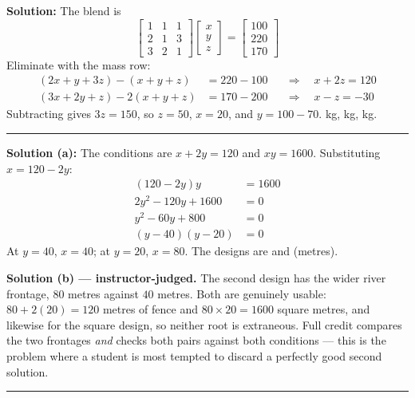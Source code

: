 \documentclass[12pt]{article}
\begin{document}
\textbf{Solution:} The blend is
\[ \begin{bmatrix} 1 & 1 & 1 \\ 2 & 1 & 3 \\ 3 & 2 & 1 \end{bmatrix}
   \begin{bmatrix} x \\ y \\ z \end{bmatrix}
   = \begin{bmatrix} 100 \\ 220 \\ 170 \end{bmatrix} \]
Eliminate with the mass row:
\begin{align*}
  (2x + y + 3z) - (x + y + z) &= 220 - 100 &&\Longrightarrow\quad x + 2z = 120 \\
  (3x + 2y + z) - 2(x + y + z) &= 170 - 200 &&\Longrightarrow\quad x - z = -30
\end{align*}
Subtracting gives $3z = 150$, so $z = 50$, $x = 20$, and $y = 100 - 70$.
 kg,  kg,  kg.

\vspace{0.2cm}\noindent\rule{\linewidth}{0.2pt}


\textbf{Solution (a):} The conditions are $x + 2y = 120$ and $xy = 1600$. Substituting
$x = 120 - 2y$:
\begin{align*}
  (120 - 2y)y &= 1600 \\
  2y^2 - 120y + 1600 &= 0 \\
  y^2 - 60y + 800 &= 0 \\
  (y - 40)(y - 20) &= 0
\end{align*}
At $y = 40$, $x = 40$; at $y = 20$, $x = 80$. The designs are  and
 (metres).

\vspace{0.15cm}
\textbf{Solution (b) --- instructor-judged.} The second design has the wider river
frontage, $80$ metres against $40$ metres. Both are genuinely usable: $80 + 2(20) = 120$
metres of fence and $80 \times 20 = 1600$ square metres, and likewise for the square design,
so neither root is extraneous. Full credit compares the two frontages \emph{and} checks both
pairs against both conditions --- this is the problem where a student is most tempted to
discard a perfectly good second solution.

\vspace{0.2cm}\noindent\rule{\linewidth}{0.2pt}
\end{document}
